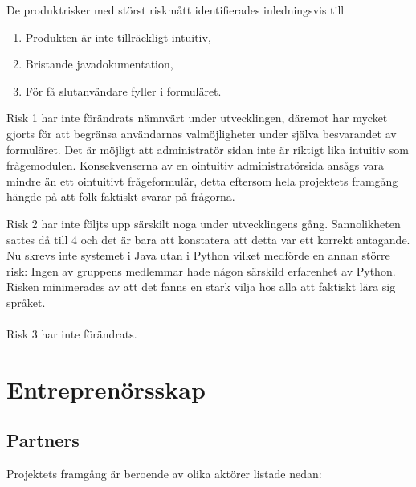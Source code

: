 \documentclass[12pt]{article}
\begin{document}
De produktrisker med störst riskmått identifierades inledningsvis till 

\begin{enumerate}
    \item Produkten är inte tillräckligt intuitiv,
    \item Bristande javadokumentation,
    \item För få slutanvändare fyller i formuläret.
\end{enumerate}

Risk 1 har inte förändrats nämnvärt under utvecklingen, däremot har mycket gjorts för att begränsa användarnas valmöjligheter under själva besvarandet av formuläret. Det är möjligt att administratör sidan inte är riktigt lika intuitiv som frågemodulen. Konsekvenserna av en ointuitiv administratörsida ansågs vara mindre än ett ointuitivt frågeformulär, detta eftersom hela projektets framgång hängde på att folk faktiskt svarar på frågorna. 

Risk 2 har inte följts upp särskilt noga under utvecklingens gång. Sannolikheten sattes då till 4 och det är bara att konstatera att detta var ett korrekt antagande. Nu skrevs inte systemet i Java utan i Python vilket medförde en annan större risk: Ingen av gruppens medlemmar hade någon särskild erfarenhet av Python. Risken minimerades av att det fanns en stark vilja hos alla att faktiskt lära sig språket.\\\\
Risk 3 har inte förändrats. 

\newpage

\section{Entreprenörsskap}
\subsection{Partners}
Projektets framgång är beroende av olika aktörer listade nedan:
\end{document}
